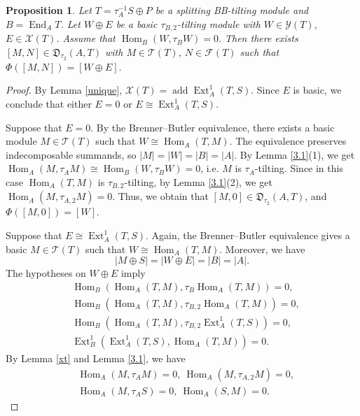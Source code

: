 \documentclass[reqno,12pt]{amsart}
\numberwithin{equation}{section}
\theoremstyle{plain}
\newtheorem{proposition}[theorem]{\bf Proposition}
\theoremstyle{definition}
\begin{document}
\begin{proposition}\label{phi-surjective-bb}
Let $T=\tau_A^{-1}S\oplus P$ be a splitting BB-tilting module and
$B=\operatorname{End}_A T$. Let $W\oplus E$ be a basic
$\tau_{B,2}$-tilting module with
\(
W\in\mathcal Y(T)\), \( E\in\mathcal X(T)\). Assume  that
\(\operatorname{Hom}_B(W,\tau_BW)=0.\)
Then there exists $[M,N]\in\mathfrak D_{\tau_2}(A,T)$ with
$M\in\mathcal T(T)$, $N\in\mathcal F(T)$ such that
\(
\Phi([M,N])=[W\oplus E].
\)
\end{proposition}
\begin{proof}
By Lemma \ref{unique}, $\mathcal X(T)
=\operatorname{add}\operatorname{Ext}_A^1(T,S)$. Since $E$ is basic, we conclude that
either $E=0$ or $E\cong\operatorname{Ext}_A^1(T,S)$.

Suppose that $E=0$. By the Brenner--Butler equivalence, there
exists a basic module $M\in\mathcal T(T)$ such that
$W\cong\operatorname{Hom}_A(T,M)$. The equivalence preserves
indecomposable summands, so $|M|=|W|=|B|=|A|$. By Lemma \ref{3.1}(1), we get
$\operatorname{Hom}_A(M,\tau_AM)\cong\operatorname{Hom}_B(W,\tau_BW)=0$, i.e. $M$ is $\tau_A$-tilting. Since in this case $\operatorname{Hom}_A(T,M)$ is $\tau_{B,2}$-tilting, by Lemma \ref{3.1}(2), we get $\operatorname{Hom}_A(M,\tau_{A,2}M)=0$. Thus, we obtain that $[M,0]\in\mathfrak D_{\tau_2}(A,T)$,
and $\Phi([M,0])=[W]$.

Suppose that $E\cong\operatorname{Ext}_A^1(T,S)$. Again, the Brenner--Butler
equivalence gives a basic $M\in\mathcal T(T)$ such that
$W\cong\operatorname{Hom}_A(T,M)$. Moreover, we have
\begin{equation}\label{zhxgss}|M\oplus S|=|W\oplus E|=|B|=|A|.\end{equation}
The hypotheses on $W\oplus E$ imply
\begin{equation*}
\begin{split}
&\operatorname{Hom}_B(\operatorname{Hom}_A(T,M),\tau_B \operatorname{Hom}_A(T,M))=0,\\
&\operatorname{Hom}_B(\operatorname{Hom}_A(T,M),\tau_{B,2} \operatorname{Hom}_A(T,M))=0,\\
&\operatorname{Hom}_B(\operatorname{Hom}_A(T,M),\tau_{B,2} \operatorname{Ext}_A^1(T,S))=0,\\
&\operatorname{Ext}_B^1(\operatorname{Ext}_A^1(T,S),\operatorname{Hom}_A(T,M))=0.
\end{split}
\end{equation*}
By Lemma \ref{xt} and Lemma \ref{3.1}, we have
\begin{equation}\label{5=0}
\begin{split}
&\operatorname{Hom}_A(M,\tau_A M)=0,~
\operatorname{Hom}_A(M,\tau_{A,2} M)=0,\\
&\operatorname{Hom}_A(M,\tau_A S)=0,~
\operatorname{Hom}_A(S,M)=0.
\end{split}
\end{equation}



\end{proof}
\end{document}
